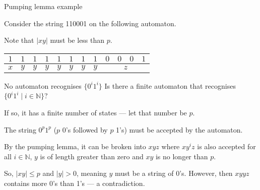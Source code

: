 \begin{frame}[fragile]{Pumping lemma example}

  Consider the string 110001 on the following automaton.

  \begin{center}
  \end{center}

  Note that $|xy|$ must be less than $p$.

  \vspace{2mm}
  \pause
  \begin{table}
  \begin{tabular}{|c|c|c|c|c|c|c|c|cccc|}
    \hline
    $1$ & $1$ & $1$ & $1$ & $1$ & $1$ & $1$ & $1$ & $0$ & $0$ & $0$ & $1$ \\
    \hline
    $x$ & $y$ & $y$ & $y$ & $y$ & $y$ & $y$ & $y$ & \multicolumn{4}{c|}{$z$} \\
    \hline
  \end{tabular}
\end{table}

\end{frame}


\begin{frame}{No automaton recognises $\{ 0^i 1^i \}$}
  \textcolor{gmitblue}{Is there a finite automaton that recognises $\{ 0^i 1^i \mid i \in \mathbb{N} \}$?}
  
  \vspace{4mm}

  If so, it has a finite number of states --- let that number be $p$.

  \vspace{2mm}

  The string $0^p1^p$ ($p$ 0's followed by $p$ 1's) must be accepted by the automaton.

  \vspace{2mm}

  By the pumping lemma, it can be broken into $xyz$ where $xy^iz$ is also accepted for all $i \in \mathbb{N}$, $y$ is of length greater than zero and $xy$ is no longer than $p$.

  \vspace{2mm}

  So, $|xy| \leq p$ and $|y| > 0$, meaning $y$ must be a string of 0's. However, then $xyyz$ contains more 0's than 1's --- a contradiction.

  
\end{frame}